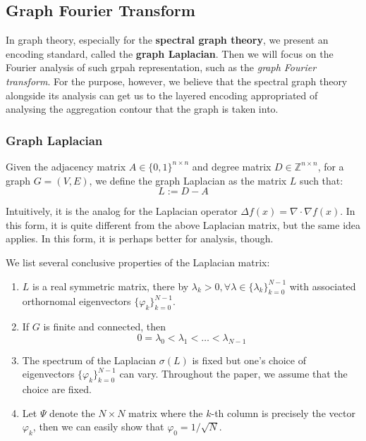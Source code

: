 \subsection{Graph Fourier Transform}

In graph theory, especially for the \textbf{spectral graph theory}, we present an encoding standard, called the \textbf{graph Laplacian}. Then we will focus on the Fourier analysis of such grpah representation, such as the \textit{graph Fourier transform}. For the purpose, however, we believe that the spectral graph theory alongside its analysis can get us to the layered encoding appropriated of analysing the aggregation contour that the graph is taken into. 
\subsubsection{Graph Laplacian}
Given the adjacency matrix $A\in \{0,1\}^{n\times n}$ and degree matrix $D\in \mathbb{Z}^{n\times n}$, for a graph $G=(V,E)$, we define the graph Laplacian as the matrix $L$ such that: \begin{equation}
  L:= D- A
\end{equation}

Intuitively, it is the analog for the Laplacian operator $\Delta f(x)= \nabla\cdot \nabla f(x)$. In this form, it is quite different from the above Laplacian matrix, but the same idea applies. In this form, it is perhaps better for analysis, though. 

We list several conclusive properties of the Laplacian matrix: 
\begin{enumerate}[itemsep=1pt,topsep=1pt]
  \item $L$ is a real symmetric matrix, there by $\lambda_k > 0, \forall \lambda \in \{\lambda_k\}_{k=0}^{N-1}$ with associated orthornomal eigenvectors $\{\varphi_k\}^{N-1}_{k=0}$.
  \item If $G$ is finite and connected, then \begin{equation}
    0= \lambda_0 < \lambda_1 < \dots < \lambda_{N-1}
  \end{equation}
  \item The spectrum of the Laplacian $\sigma(L)$ is fixed but one's choice of eigenvectors $\{\varphi_k\}^{N-1}_{k=0}$ can vary. Throughout the paper, we assume that the choice are fixed. 
  \item Let $\Psi$ denote the $N\times N$ matrix where the $k$-th column is precisely the vector $\varphi_k$, then we can easily show that $\varphi_0 = 1/\sqrt{N}$. 
\end{enumerate}

